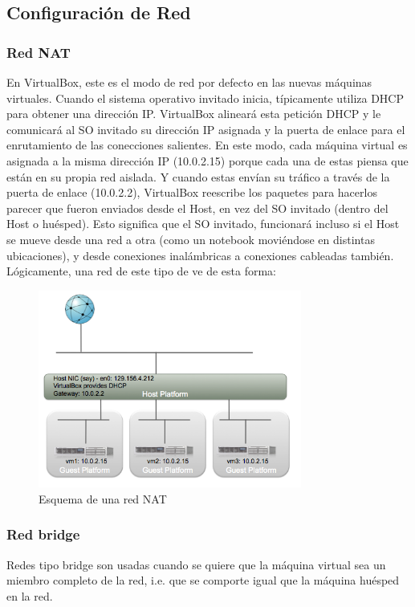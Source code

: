 \documentclass[11pt]{article}
\begin{document}
\subsection{Configuración de Red}
\subsubsection{Red NAT}
En VirtualBox, este es el modo de red por defecto en las nuevas máquinas virtuales. Cuando el sistema operativo invitado inicia, típicamente utiliza DHCP para obtener una dirección IP. VirtualBox alineará esta petición DHCP y le comunicará al SO invitado su dirección IP asignada y la puerta de enlace para el enrutamiento de las conecciones salientes. En este modo, cada máquina virtual es asignada a la misma dirección IP (10.0.2.15) porque cada una de estas piensa que están en su propia red aislada. Y cuando estas envían su tráfico a través de la puerta de enlace (10.0.2.2), VirtualBox reescribe los paquetes para hacerlos parecer que fueron enviados desde el Host, en vez del SO invitado (dentro del Host o huésped).
Esto significa que el SO invitado, funcionará incluso si el Host se mueve desde una red a otra (como un notebook moviéndose en distintas ubicaciones), y desde conexiones inalámbricas a conexiones cableadas también. Lógicamente, una red de este tipo de ve de esta forma:

	\begin{figure}[ht]
	\center
	\includegraphics[width=0.5\linewidth, height=6.5cm]{screenshots/nat-network.png} 
	\caption{Esquema de una red NAT}
	\end{figure}

\clearpage

\subsubsection{Red bridge}
	Redes tipo bridge son usadas cuando se quiere que la máquina virtual sea un miembro completo de la red, i.e. que se comporte igual que la máquina huésped en la red.
\end{document}
